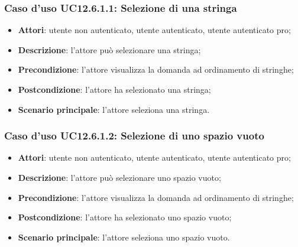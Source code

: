 \subsubsection{Caso d'uso UC12.6.1.1: Selezione di una stringa}
\begin{itemize}
\item \textbf{Attori}: utente non autenticato, utente autenticato, utente autenticato pro;
\item \textbf{Descrizione}: l'attore può selezionare una stringa;
\item \textbf{Precondizione}: l'attore visualizza la domanda ad ordinamento di stringhe;
\item \textbf{Postcondizione}: l'attore ha selezionato una stringa;
\item \textbf{Scenario principale}: l'attore seleziona una stringa.
\end{itemize}

\subsubsection{Caso d'uso UC12.6.1.2: Selezione di uno spazio vuoto}
\begin{itemize}
\item \textbf{Attori}: utente non autenticato, utente autenticato, utente autenticato pro;
\item \textbf{Descrizione}: l'attore può selezionare uno spazio vuoto;
\item \textbf{Precondizione}: l'attore visualizza la domanda ad ordinamento di stringhe;
\item \textbf{Postcondizione}: l'attore ha selezionato uno spazio vuoto;
\item \textbf{Scenario principale}: l'attore seleziona uno spazio vuoto.
\end{itemize}

